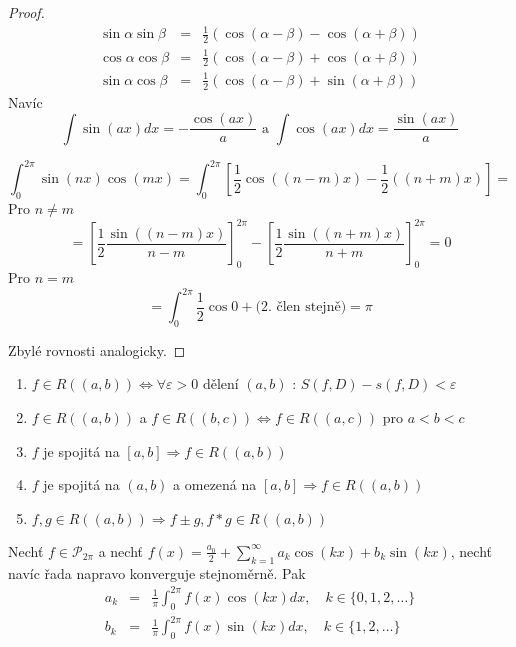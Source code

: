 \begin{proof}

\begin{eqnarray*}
\sin \alpha \sin \beta & = & \frac{1}{2} \left( \cos (\alpha - \beta) - \cos (\alpha + \beta) \right) \\
\cos \alpha \cos \beta & = & \frac{1}{2} \left( \cos (\alpha - \beta) + \cos (\alpha + \beta) \right) \\
\sin \alpha \cos \beta & = & \frac{1}{2} \left( \cos (\alpha - \beta) + \sin (\alpha + \beta) \right) 
\end{eqnarray*}
Navíc
$$\int \sin(ax) dx = -\frac{\cos (ax)}{a} \textrm { a } \int \cos (ax) dx = \frac{\sin (ax)}{a}$$

$$\int_{0}^{2 \pi} \sin (nx) \cos(mx) = \int_{0}^{2 \pi} \left[ \frac{1}{2} \cos \left( (n-m)x \right) - \frac{1}{2} \left( (n+m)x \right) \right] = $$
Pro $n \neq m$
$$= \left[ \frac{1}{2} \frac{\sin \left( (n-m)x \right)}{n-m} \right]_{0}^{2 \pi} - \left[ \frac{1}{2} \frac{\sin \left( (n+m)x \right)}{n+m} \right]_{0}^{2 \pi} = 0$$
Pro $n=m$
$$=\int_{0}^{2 \pi} \frac{1}{2} \cos 0 + \textrm{(2. člen stejně)} = \pi$$

Zbylé rovnosti analogicky.
\end{proof}\begin{opakovani} \quad
\begin{enumerate}
\item $f \in R((a,b)) \Leftrightarrow \forall \varepsilon > 0 \textrm{ dělení } (a,b)$ : $S(f,D) -s(f,D) < \varepsilon$
\item $f \in R((a,b))$ a $f \in R((b,c)) \Leftrightarrow f \in R((a,c))$ pro $a<b<c$
\item $f$ je spojitá na $[a,b] \Rightarrow f \in R((a,b))$
\item $f$ je spojitá na $(a,b)$ a omezená na $[a,b] \Rightarrow f \in R((a,b))$
\item $f, g \in R((a,b)) \Rightarrow f \pm g, f * g \in R((a,b))$
\end{enumerate}
\end{opakovani}

\begin{vetal}
Nechť $f \in \mathcal{P}_{2 \pi}$ a nechť $f(x) = \frac{a_0}{2} + \sum_{k=1}^{\infty} a_k \cos(kx) + b_k \sin(kx)$, nechť navíc řada napravo konverguje stejnoměrně. Pak
\begin{eqnarray*}
a_k & = & \frac{1}{\pi} \int_0^{2 \pi} f(x) \cos(kx) dx, \quad k \in \{0, 1, 2, \ldots\} \\
b_k & = & \frac{1}{\pi} \int_0^{2 \pi} f(x) \sin(kx) dx, \quad k \in \{1, 2, \ldots\} 
\end{eqnarray*}
\end{vetal}

